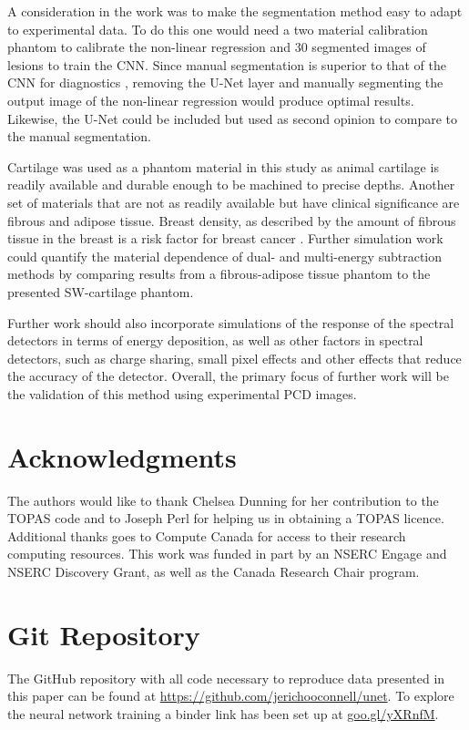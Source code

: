 \documentclass[a4paper,11pt]{article}
\begin{document}
A consideration in the work was to make the segmentation method easy to adapt to experimental data. To do this one would need a two material calibration phantom to calibrate the non-linear regression and 30 segmented images of lesions to train the CNN. Since manual segmentation is superior to that of the CNN for diagnostics \cite{Ronneberger2015U-Net:Segmentation}, removing the U-Net layer and manually segmenting the output image of the non-linear regression would produce optimal results. Likewise, the U-Net could be included but used as second opinion to compare to the manual segmentation.

Cartilage was used as a phantom material in this study as animal cartilage is readily available and durable enough to be machined to precise depths. Another set of materials that are not as readily available but have clinical significance are fibrous and adipose tissue. Breast density, as described by the amount of fibrous tissue in the breast is a risk factor for breast cancer \cite{McCormack2006BreastMeta-analysis}. Further simulation work could quantify the material dependence of  dual- and multi-energy subtraction methods by comparing results from a fibrous-adipose tissue phantom to the presented SW-cartilage phantom. 

Further work should also incorporate simulations of the response of the spectral detectors in terms of energy deposition, as well as other factors in spectral detectors, such as charge sharing, small pixel effects and other effects that reduce the accuracy of the detector. Overall, the primary focus of further work will be the validation of this method using experimental PCD images.



 \section*{Acknowledgments}

The authors would like to thank Chelsea Dunning for her contribution to the TOPAS code and to Joseph Perl for helping us in obtaining a TOPAS licence. Additional thanks goes to Compute Canada for access to their research computing resources. This work was funded in part by an NSERC Engage and NSERC Discovery Grant, as well as the Canada Research Chair program. 



\appendix{}
\section{Git Repository}
The GitHub repository with all code necessary to reproduce data presented in this paper can be found at \href{https://github.com/jerichooconnell/unet}{https://github.com/jerichooconnell/unet}. To explore the neural network training a binder link has been set up at \href{https://mybinder.org/v2/gh/jerichooconnell/unet/master?filepath=unet\%2FtrainUnet.ipynb}{goo.gl/yXRnfM}.









\vfill




\end{document}
